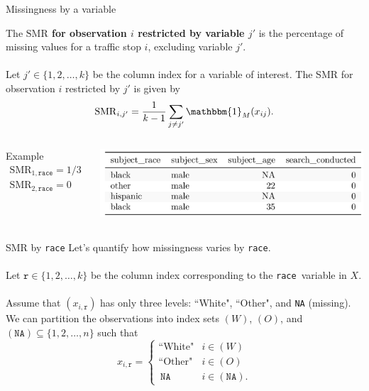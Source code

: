 \documentclass[11pt]{beamer}
\newcommand{\indic}{\mathbbm{1}_M}
\newcommand{\SMR}{\mathrm{SMR}}
\newcommand{\race}{\texttt{race}}
\newcommand{\rrr}{\texttt{r}}
\begin{document}
\begin{frame}{Missingness by a variable}
    \begin{definition}
    The {\bf{$\SMR$ for observation $i$ restricted by variable $j'$}} is the percentage of missing values for a traffic stop $i$, excluding variable $j'$. 
    \\~\\
    Let $j' \in \{1, 2, \ldots, k\}$ be the column index for a variable of interest. The SMR for observation $i$ restricted by $j'$ is given by
    \begin{equation*}
    \SMR_{i, j'} = \dfrac{1}{k-1} \sum_{j \neq j'} \indic(x_{ij}).
    \end{equation*}
    \end{definition} \pause
    \begin{columns}
        Example
            \begin{gather*}
    	    \SMR_{1, \texttt{race}} = 1/3 \\
	    \SMR_{2, \texttt{race}} = 0 \\
	    \end{gather*}
	    \begin{center}
	    \includegraphics[scale = 0.6]{fig/toyoak.png}
	    \end{center}
    \end{columns}
\end{frame}

\begin{frame}{SMR by \race}
    Let's quantify how missingness varies by \race. 
    \\~\\
    Let $\rrr \in \{ 1, 2, \ldots, k \}$ be the column index corresponding to the \race \,  variable in $X$. 
    \\~\\
    Assume that $(x_{i, \rrr})$ has only three levels: ``White", ``Other", and \texttt{NA} (missing). We can partition the observations into index sets $(W)$, $(O)$, and $(\texttt{NA}) \subseteq \{1, 2, \ldots, n\}$ such that
    \begin{equation*}
    x_{i, \rrr} =
    \begin{cases}
    	\text{``White"} & i \in (W) \\
	\text{``Other"} & i \in (O) \\
	\, \texttt{NA} & i \in (\texttt{NA}).
    \end{cases}
    \end{equation*}
\end{frame}
\end{document}
